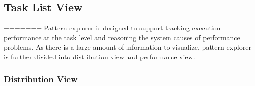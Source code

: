 \subsection{Task List View}
=======
Pattern explorer is designed to support tracking execution performance at the task level and reasoning the system causes of performance problems. As there is a large amount of information to visualize, pattern explorer is further divided into distribution view and performance view.

\subsubsection{Distribution View}
%
